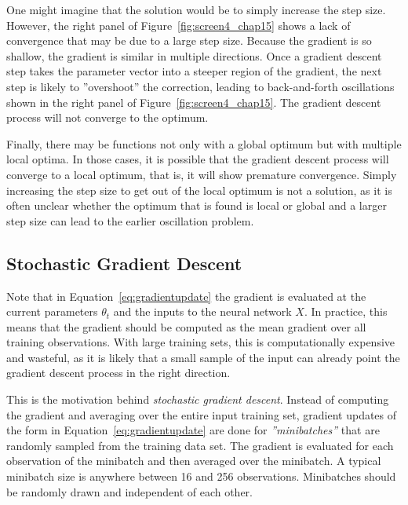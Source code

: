 One might imagine that the solution would be to simply increase the step size. However, the right panel of Figure~\ref{fig:screen4_chap15} shows a lack of convergence that may be due to a large step size. Because the gradient is so shallow, the gradient is similar in multiple directions. Once a gradient descent step takes the parameter vector into a steeper region of the gradient, the next step is likely to ''overshoot'' the correction, leading to back-and-forth oscillations shown in the right panel of Figure~\ref{fig:screen4_chap15}. The gradient descent process will not converge to the optimum. 

Finally, there may be functions not only with a global optimum but with multiple local optima. In those cases, it is possible that the gradient descent process will converge to a local optimum, that is, it will show premature convergence. Simply increasing the step size to get out of the local optimum is not a solution, as it is often unclear whether the optimum that is found is local or global and a larger step size can lead to the earlier oscillation problem.

\subsection{Stochastic Gradient Descent}

Note that in Equation~\ref{eq:gradientupdate} the gradient is evaluated at the current parameters $\theta_t$ and the inputs to the neural network $X$. In practice, this means that the gradient should be computed as the mean gradient over all training observations. With large training sets, this is computationally expensive and wasteful, as it is likely that a small sample of the input can already point the gradient descent process in the right direction. 

This is the motivation behind \emph{stochastic gradient descent}. Instead of computing the gradient and averaging over the entire input training set, gradient updates of the form in Equation~\ref{eq:gradientupdate} are done for \emph{''minibatches''} that are randomly sampled from the training data set. The gradient is evaluated for each observation of the minibatch and then averaged over the minibatch. A typical minibatch size is anywhere between 16 and 256 observations. Minibatches should be randomly drawn and independent of each other. 

